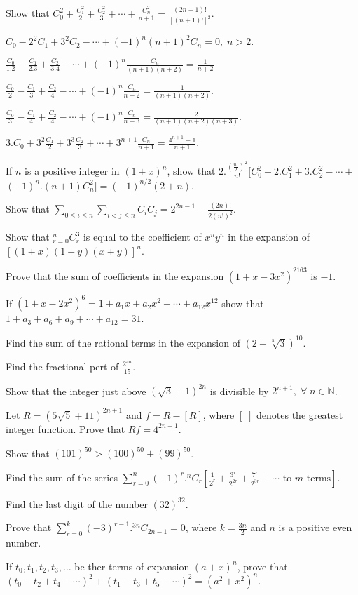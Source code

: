 \item Show that $C_0^2 + \frac{C_1^2}{2} + \frac{C_2^2}{3} + \cdots + \frac{C_n^2}{n + 1} = \frac{(2n + 1)!}{[(n + 1)!]^2}$.
\item $C_0 - 2^2C_1 + 3^2C_2 - \cdots + (-1)^n(n + 1)^2C_n = 0,\;n>2$.
\item $\frac{C_0}{1.2} - \frac{C_1}{2.3} + \frac{C_2}{3.4} - \cdots + (-1)^n\frac{C_n}{(n + 1)(n + 2)} = \frac{1}{n + 2}$
\item $\frac{C_0}{2} - \frac{C_1}{3} + \frac{C_2}{4} - \cdots + (-1)^n\frac{C_n}{n + 2} = \frac{1}{(n + 1)(n + 2)}$.
\item $\frac{C_0}{3} - \frac{C_1}{4} + \frac{C_2}{4} - \cdots + (-1)^n\frac{C_n}{n + 3} = \frac{2}{(n + 1)(n + 2)(n + 3)}$.
\item $3.C_0 + 3^2\frac{C_1}{2} + 3^3\frac{C_2}{3} + \cdots + 3^{n + 1}\frac{C_n}{n+ 1} = \frac{4^{n + 1} - 1}{n + 1}$.
\item If $n$ is a positive integer in $(1 + x)^n$, show that $2.\frac{\left(\frac{n!}{2}\right)^2}{n!}[C_0^2 - 2.C_1^2 +
  3.C_2^2 - \cdots + $ $(-1)^n.(n + 1)C_n^2] = (-1)^{n/2}(2 + n)$.
\item Show that $\displaystyle\sum_{0\leq i\leq n}\sum_{i<j\leq n}C_iC_j = 2^{2n - 1} - \frac{(2n)!}{2(n!)^2}$.
\item Show that $\displaystyle_{r=0}^nC_r^3$ is equal to the coefficient of $x^ny^n$ in the expansion of $[(1 + x)(1 + y)(x +
  y)]^n$.
\item Prove that the sum of coefficients in the expansion $(1 + x -3x^2)^{2163}$ is $-1$.
\item If $(1 + x - 2x^2)^6 = 1 + a_1x + a_2x^2 + \cdots + a_{12}x^{12}$ show that $1 + a_3 + a_6 + a_9 +
  \cdots + a_{12} = 31$.
\item Find the sum of the rational terms in the expansion of $(2 + \sqrt[5]{3})^{10}$.
\item Find the fractional pert of $\frac{2^{4n}}{15}$.
\item Show that the integer just above $(\sqrt{3} + 1)^{2n}$ is divisible by $2^{n + 1},\;\forall\;n\in\mathbb{N}$.
\item Let $R = (5\sqrt{5} + 11)^{2n + 1}$ and $f = R - [R]$, where $[\;]$ denotes the greatest integer function. Prove that $Rf =
  4^{2n + 1}$.
\item Show that $(101)^{50} > (100)^{50} + (99)^{50}$.
\item Find the sum of the series $\displaystyle\sum_{r=0}^n(-1)^r.{}^nC_r\left[\frac{1}{2^r} + \frac{3^r}{2^{2r}} +
  \frac{7^r}{2^{3r}} + \cdots \text{~to~}m\text{~terms}\right]$.
\item Find the last digit of the number $(32)^{32}$.
\item Prove that $\displaystyle\sum_{r=0}^k(-3)^{r - 1}.{}^{3n}C_{2n- 1} = 0$, where $k = \frac{3n}{2}$ and $n$ is a positive even
  number.
\item If $t_0, t_1, t_2, t_3, \ldots$ be ther terms of expansion $(a + x)^n$, prove that $(t_0 - t_2 + t_4 - \cdots)^2 + (t_1 - t_3
  + t_5 - \cdots)^2 = (a^2 + x^2)^n$.
\stopitemize

